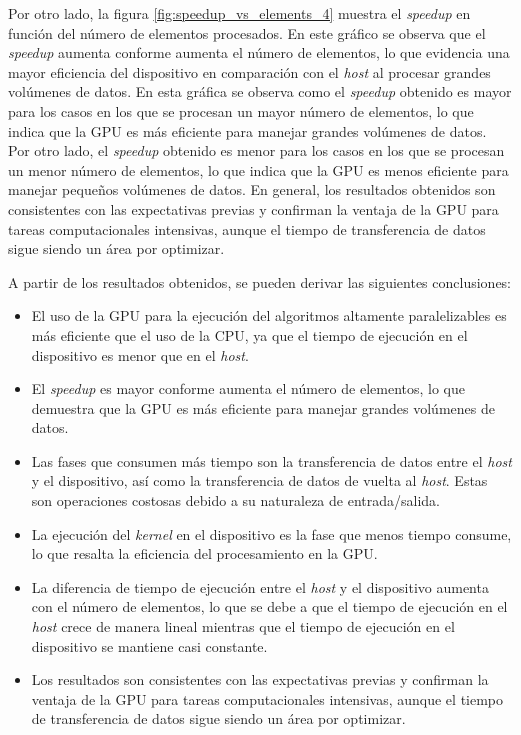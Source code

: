 \documentclass{article}
\begin{document}
			Por otro lado, la figura \ref{fig:speedup_vs_elements_4} muestra el \textit{speedup} en función del número de elementos procesados. En este gráfico se observa que el \textit{speedup} aumenta conforme aumenta el número de elementos, lo que evidencia una mayor eficiencia del dispositivo en comparación con el \textit{host} al procesar grandes volúmenes de datos. En esta gráfica se observa como el \textit{speedup} obtenido es mayor para los casos en los que se procesan un mayor número de elementos, lo que indica que la GPU es más eficiente para manejar grandes volúmenes de datos. Por otro lado, el \textit{speedup} obtenido es menor para los casos en los que se procesan un menor número de elementos, lo que indica que la GPU es menos eficiente para manejar pequeños volúmenes de datos. En general, los resultados obtenidos son consistentes con las expectativas previas y confirman la ventaja de la GPU para tareas computacionales intensivas, aunque el tiempo de transferencia de datos sigue siendo un área por optimizar.

			A partir de los resultados obtenidos, se pueden derivar las siguientes conclusiones:

			\begin{itemize}

				\item El uso de la GPU para la ejecución del algoritmos altamente paralelizables es más eficiente que el uso de la CPU, ya que el tiempo de ejecución en el dispositivo es menor que en el \textit{host}.

				\item El \textit{speedup} es mayor conforme aumenta el número de elementos, lo que demuestra que la GPU es más eficiente para manejar grandes volúmenes de datos.

				\item Las fases que consumen más tiempo son la transferencia de datos entre el \textit{host} y el dispositivo, así como la transferencia de datos de vuelta al \textit{host}. Estas son operaciones costosas debido a su naturaleza de entrada/salida.

				\item La ejecución del \textit{kernel} en el dispositivo es la fase que menos tiempo consume, lo que resalta la eficiencia del procesamiento en la GPU.

				\item La diferencia de tiempo de ejecución entre el \textit{host} y el dispositivo aumenta con el número de elementos, lo que se debe a que el tiempo de ejecución en el \textit{host} crece de manera lineal mientras que el tiempo de ejecución en el dispositivo se mantiene casi constante.

				\item Los resultados son consistentes con las expectativas previas y confirman la ventaja de la GPU para tareas computacionales intensivas, aunque el tiempo de transferencia de datos sigue siendo un área por optimizar.

			\end{itemize}
\end{document}

